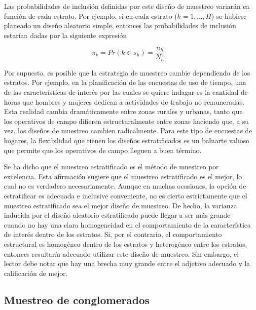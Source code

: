 \documentclass[
  12pt,
  spanish,
]{book}
\begin{document}
Las probabilidades de inclusión definidas por este diseño de muestreo variarán en función de cada estrato. Por ejemplo, si en cada estrato (\(h=1, \ldots, H\)) se hubiese planeado un diseño aleatorio simple, entonces las probabilidades de inclusión estarían dadas por la siguiente expresión

\[\pi_k = Pr(k \in s_h) = \frac{n_h}{N_h}\]

Por supuesto, es posible que la estrategia de muestreo cambie dependiendo de los estratos. Por ejemplo, en la planificación de las encuestas de uso de tiempo, una de las características de interés por las cuales se quiere indagar es la cantidad de horas que hombres y mujeres dedican a actividades de trabajo no remuneradas. Esta realidad cambia dramáticamente entre zonas rurales y urbanas, tanto que los operativos de campo difieren estructuralmente entre zonas haciendo que, a su vez, los diseños de muestreo cambien radicalmente. Para este tipo de encuestas de hogares, la flexibilidad que tienen los diseños estratificados es un baluarte valioso que permite que los operativos de campo lleguen a buen término.

Se ha dicho que el muestreo estratificado es el método de muestreo por excelencia. Esta afirmación sugiere que el muestreo estratificado es el mejor, lo cual no es verdadero necesariamente. Aunque en muchas ocasiones, la opción de estratificar es adecuada e inclusive conveniente, no es cierto estrictamente que el muestreo estratificado sea el mejor diseño de muestreo. De hecho, la varianza inducida por el diseño aleatorio estratificado puede llegar a ser más grande cuando no hay una clara homogeneidad en el comportamiento de la característica de interés dentro de los estratos. Si, por el contrario, el comportamiento estructural es homogéneo dentro de los estratos y heterogéneo entre los estratos, entonces resultaría adecuado utilizar este diseño de muestreo. Sin embargo, el lector debe notar que hay una brecha muy grande entre el adjetivo adecuado y la calificación de mejor.

\hypertarget{muestreo-de-conglomerados}{%
\subsection*{Muestreo de conglomerados}\label{muestreo-de-conglomerados}}
\end{document}

